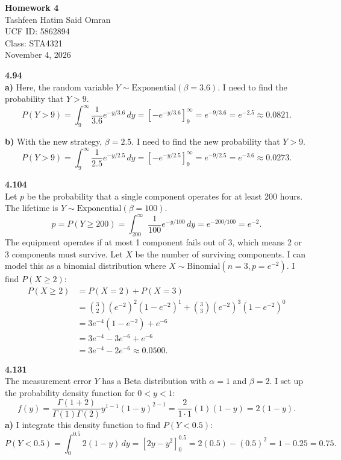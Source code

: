 \documentclass[12pt]{article}
\begin{document}
\begin{center}
\textbf{\Large Homework 4} \\
Tashfeen Hatim Said Omran \\
UCF ID: 5862894 \\
Class: STA4321 \\
November 4, 2026
\end{center}

\vspace{0.5cm}

\noindent \textbf{4.94} \\
\textbf{a)} Here, the random variable $Y \sim \text{Exponential}(\beta = 3.6)$. I need to find the probability that $Y > 9$. 
\[ P(Y > 9) = \int_9^\infty \frac{1}{3.6} e^{-y/3.6} \, dy = \left[ -e^{-y/3.6} \right]_9^\infty = e^{-9/3.6} = e^{-2.5} \approx 0.0821. \]

\vspace{0.2cm}
\noindent \textbf{b)} With the new strategy, $\beta = 2.5$. I need to find the new probability that $Y > 9$.
\[ P(Y > 9) = \int_9^\infty \frac{1}{2.5} e^{-y/2.5} \, dy = \left[ -e^{-y/2.5} \right]_9^\infty = e^{-9/2.5} = e^{-3.6} \approx 0.0273. \]

\vspace{0.5cm}

\noindent \textbf{4.104} \\
Let $p$ be the probability that a single component operates for at least 200 hours. The lifetime is $Y \sim \text{Exponential}(\beta = 100)$.
\[ p = P(Y \ge 200) = \int_{200}^\infty \frac{1}{100} e^{-y/100} \, dy = e^{-200/100} = e^{-2}. \]
The equipment operates if at most 1 component fails out of 3, which means 2 or 3 components must survive. Let $X$ be the number of surviving components. I can model this as a binomial distribution where $X \sim \text{Binomial}(n=3, p=e^{-2})$. I find $P(X \ge 2)$:
\begin{align*}
P(X \ge 2) &= P(X=2) + P(X=3) \\
&= \binom{3}{2}(e^{-2})^2(1-e^{-2})^1 + \binom{3}{3}(e^{-2})^3(1-e^{-2})^0 \\
&= 3e^{-4}(1-e^{-2}) + e^{-6} \\
&= 3e^{-4} - 3e^{-6} + e^{-6} \\
&= 3e^{-4} - 2e^{-6} \approx 0.0500.
\end{align*}

\vspace{0.5cm}

\noindent \textbf{4.131} \\
The measurement error $Y$ has a Beta distribution with $\alpha=1$ and $\beta=2$. I set up the probability density function for $0 < y < 1$:
\[ f(y) = \frac{\Gamma(1+2)}{\Gamma(1)\Gamma(2)} y^{1-1}(1-y)^{2-1} = \frac{2}{1 \cdot 1}(1)(1-y) = 2(1-y). \]
\textbf{a)} I integrate this density function to find $P(Y < 0.5)$:
\[ P(Y < 0.5) = \int_0^{0.5} 2(1-y) \, dy = \left[ 2y - y^2 \right]_0^{0.5} = 2(0.5) - (0.5)^2 = 1 - 0.25 = 0.75. \]
\end{document}
